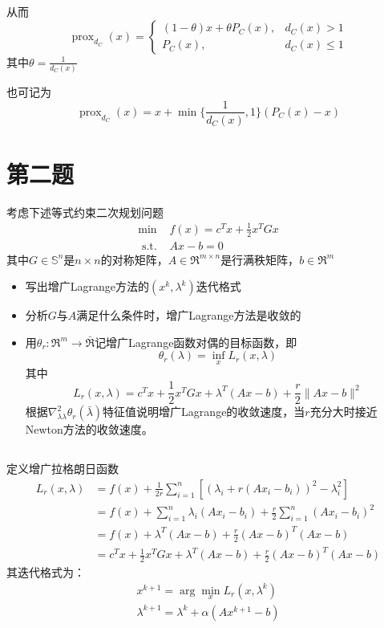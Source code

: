 \documentclass[fontset=mac]{ctexart}
\begin{document}
	从而
	$$
	\operatorname{prox}_{ d_{C}}({x})=\left\{\begin{array}{ll}
		(1-\theta) {x}+\theta P_{C}({x}), & d_{C}({x})>1 \\
		P_{C}({x}), & d_{C}({x}) \leq 1
	\end{array}\right.
	$$
	其中$\theta = \frac{1}{d_C(x)}$
	
	也可记为
	$$
	\operatorname{prox}_{d_C}(x) = x + \min\{\frac{1}{d_C(x)},1\}(P_C(x)-x)
	$$
	
	\newpage
	\section{第二题}
	考虑下述等式约束二次规划问题
	$$
	\begin{array}{ll}
		\min & f(x)=c^{T} x+\frac{1}{2} x^{T} G x \\
		\text { s.t. } & A x-b=0
	\end{array}
	$$
	其中$G \in \mathbb{S}^n$是$n \times n$的对称矩阵，$A \in \mathfrak{R}^{m \times n}$是行满秩矩阵，$b \in \mathfrak{R}^m$
	\begin{itemize}
		\item 写出增广Lagrange方法的$(x^k,\lambda^k)$迭代格式
		\item 分析$G$与$A$满足什么条件时，增广Lagrange方法是收敛的
		\item 用$\theta_{r}: \Re^{m} \rightarrow \bar{\Re}$记增广Lagrange函数对偶的目标函数，即
		$$
		\theta_{r}(\lambda)=\inf _{x} L_{r}(x, \lambda)
		$$
		其中
		$$
		L_{r}(x, \lambda)=c^{T} x+\frac{1}{2} x^{T} G x+\lambda^{T}(A x-b)+\frac{r}{2}\|A x-b\|^{2}
		$$
		根据$\nabla_{\lambda \lambda}^{2} \theta_{r}(\bar{\lambda})$特征值说明增广Lagrange的收敛速度，当$r$充分大时接近Newton方法的收敛速度。
	\end{itemize}
	\subsection{}
	定义增广拉格朗日函数
	$$
	\begin{aligned}
		L_r(x,\lambda) &= f(x) + \frac{1}{2r}\sum_{i=1}^{n}[(\lambda_i + r(Ax_i - b_i))^2 - \lambda_i^2] \\
		&= f(x) + \sum_{i=1}^{n}\lambda_i(Ax_i - b_i) + \frac{r}{2}\sum_{i=1}^{n}(Ax_i - b_i)^2 \\
		&= f(x) + \lambda^T(Ax-b) + \frac{r}{2}(Ax - b)^T(Ax-b) \\
		& = c^Tx + \frac{1}{2}x^TGx + \lambda^T(Ax-b) + \frac{r}{2}(Ax - b)^T(Ax-b)
	\end{aligned}
	$$
	其迭代格式为：
	$$
	\begin{array}{l}
		x^{k+1} = \arg \min_{x} L_r(x,\lambda^k) \\
		\lambda^{k+1} = \lambda^k + \alpha (Ax^{k+1} - b)
	\end{array}
	$$
\end{document}
